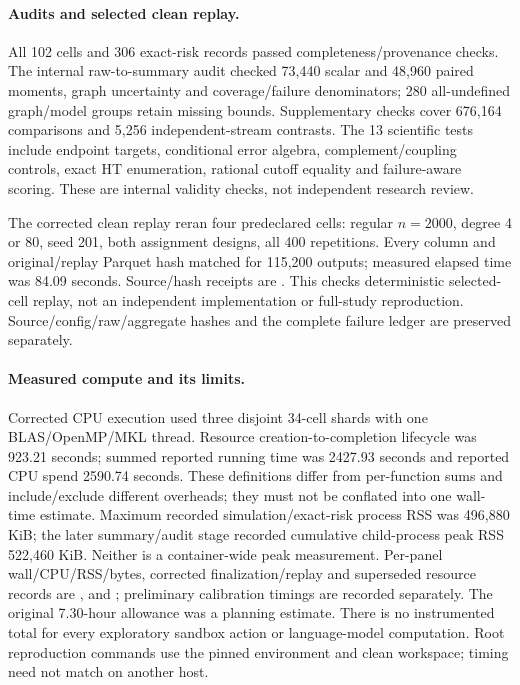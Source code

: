 \paragraph{Audits and selected clean replay.}
All 102 cells and 306 exact-risk records passed completeness/provenance checks. The internal raw-to-summary audit checked 73,440 scalar and 48,960 paired moments, graph uncertainty and coverage/failure denominators; 280 all-undefined graph/model groups retain missing bounds. Supplementary checks cover 676,164 comparisons and 5,256 independent-stream contrasts. The 13 scientific tests include endpoint targets, conditional error algebra, complement/coupling controls, exact HT enumeration, rational cutoff equality and failure-aware scoring. These are internal validity checks, not independent research review.

The corrected clean replay reran four predeclared cells: regular $n=2000$, degree 4 or 80, seed 201, both assignment designs, all 400 repetitions. Every column and original/replay Parquet hash matched for 115,200 outputs; measured elapsed time was 84.09 seconds. Source/hash receipts are . This checks deterministic selected-cell replay, not an independent implementation or full-study reproduction. Source/config/raw/aggregate hashes and the complete failure ledger are preserved separately.

\paragraph{Measured compute and its limits.}
Corrected CPU execution used three disjoint 34-cell shards with one BLAS/OpenMP/MKL thread. Resource creation-to-completion lifecycle was 923.21 seconds; summed reported running time was 2427.93 seconds and reported CPU spend 2590.74 seconds. These definitions differ from per-function sums and include/exclude different overheads; they must not be conflated into one wall-time estimate. Maximum recorded simulation/exact-risk process RSS was 496,880 KiB; the later summary/audit stage recorded cumulative child-process peak RSS 522,460 KiB. Neither is a container-wide peak measurement. Per-panel wall/CPU/RSS/bytes, corrected finalization/replay and superseded resource records are ,  and ; preliminary calibration timings are recorded separately. The original 7.30-hour allowance was a planning estimate. There is no instrumented total for every exploratory sandbox action or language-model computation. Root reproduction commands use the pinned environment and clean workspace; timing need not match on another host.
